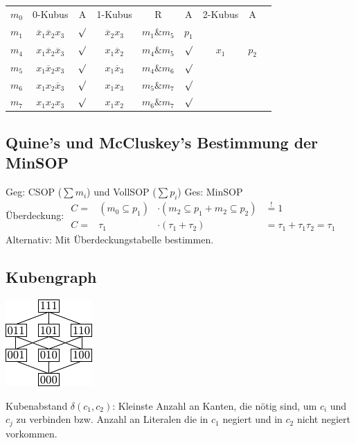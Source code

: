 \documentclass[6pt,a4paper]{scrartcl}
\begin{document}
\begin{multicols}{3}
\begin{tabular}{l | c | c  || c | c | c || c | c | r}
$m_0$ & 0-Kubus & A & 1-Kubus & R & A & 2-Kubus  & A \\
$m_1$ & $\overline x_1 \overline x_2 x_3$ & $\surd$ & $\overline x_2 x_3$ & $m_1 \& m_5$ & $p_1$ & &\\
$m_4$ & $x_1 \overline x_2 \overline x_3$ & $\surd$ & $x_1 \overline x_2$ & $m_4 \& m_5$ & $\surd$ & $x_1$ &   $p_2$\\
$m_5$ & $x_1 \overline x_2  x_3$ & $\surd$  & $x_1 \overline x_3$ & $m_4 \& m_6$ & $\surd$& &\\
$m_6$ & $x_1 x_2 \overline x_3$ & $ \surd$ & $x_1 x_3$ & $ m_5 \& m_7$ & $ \surd$ & &\\
$m_7$ & $x_1 x_2 x_3$ & $\surd$ & $x_1 x_2$ & $m_6 \& m_7 $ & $ \surd$ & &\\
\end{tabular}

	\subsection{Quine's und McCluskey's Bestimmung der MinSOP}
	Geg: CSOP ($\sum m_i$) und VollSOP ($\sum p_i$) \qquad Ges: MinSOP\\
	Überdeckung: $\begin{array}{rccl} C = & (m_0 \subseteq p_1) & \cdot (m_2 \subseteq p_1 + m_2 \subseteq p_2) & \stackrel{!}=1 \\ C = & \tau_1 & \cdot (\tau_1 + \tau_2) & = \tau_1 + \tau_1 \tau_2 = \tau_1 \end{array}$ \\
	Alternativ: Mit Überdeckungstabelle bestimmen.

	\subsection{Kubengraph}
	\parbox{3.0cm}{\includegraphics{img/ds/kubengraph.pdf} }
	\parbox{6.0cm}{Kubenabstand $\delta(c_1, c_2)$: Kleinste Anzahl an Kanten, die nötig sind, um $c_i$ und $c_j$ zu verbinden bzw.
	Anzahl an Literalen die in $c_1$ negiert und in $c_2$ nicht negiert vorkommen.\\
	
}
\end{multicols}
\end{document}
